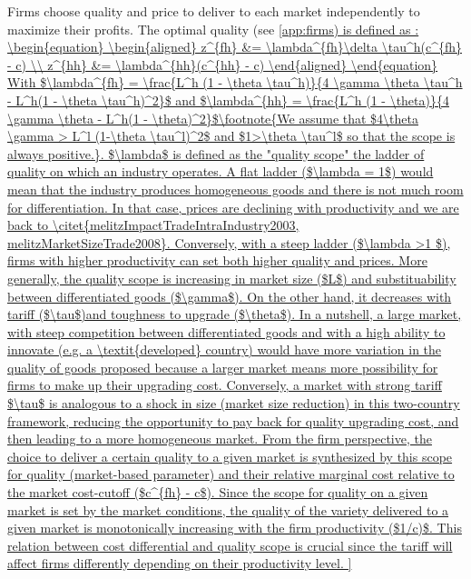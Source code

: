 Firms choose quality and price to deliver to each market independently to maximize their profits. 
The optimal quality (see \autoref{app:firms) is defined as : 
\begin{equation}
    \begin{aligned}
        z^{fh} &= \lambda^{fh}\delta \tau^h(c^{fh} - c) \\
        z^{hh} &= \lambda^{hh}(c^{hh} - c)
    \end{aligned}
\end{equation}

With $\lambda^{fh} = \frac{L^h (1 - \theta \tau^h)}{4 \gamma \theta \tau^h - L^h(1 - \theta \tau^h)^2}$ and $\lambda^{hh} = \frac{L^h (1 - \theta)}{4 \gamma \theta - L^h(1 - \theta)^2}$\footnote{We assume that $4\theta \gamma > L^l (1-\theta \tau^l)^2$ and $1>\theta \tau^l$ so that the scope is always positive.}. $\lambda$ is defined as the "quality scope" the ladder of quality on which an industry operates. A flat ladder ($\lambda = 1$) would mean that the industry produces homogeneous goods and there is not much room for differentiation. In that case, prices are declining with productivity and we are back to \citet{melitzImpactTradeIntraIndustry2003, melitzMarketSizeTrade2008}. Conversely, with a steep ladder ($\lambda >1 $), firms with higher productivity can set both higher quality and prices. 

More generally, the quality scope is increasing in market size ($L$) and substituability between differentiated goods ($\gamma$). On the other hand, it decreases with tariff ($\tau$)and toughness to upgrade ($\theta$). In a nutshell, a large market, with steep competition between differentiated goods and with a high ability to innovate (e.g. a \textit{developed} country) would have more variation in the quality of goods proposed because a larger market means more possibility for firms to make up their upgrading cost. Conversely, a market with strong tariff $\tau$ is analogous to a shock in size (market size reduction) in this two-country framework, reducing the opportunity to pay back for quality upgrading cost, and then leading to a more homogeneous market.

From the firm perspective, the choice to deliver a certain quality to a given market is synthesized by this scope for quality (market-based parameter) and their relative marginal cost relative to the market cost-cutoff ($c^{fh} - c$). Since the scope for quality on a given market is set by the market conditions, the quality of the variety delivered to a given market is monotonically increasing with the firm productivity ($1/c)$. This relation between cost differential and quality scope is crucial since the tariff will affect firms differently depending on their productivity level.

}
